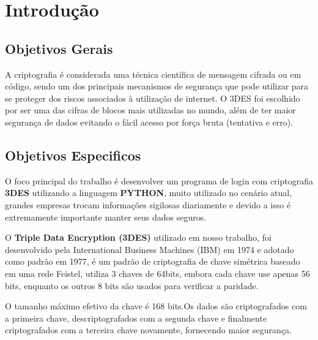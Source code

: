 




\textual\newpage
\chapter{\textbf{Introdução}}

\section{\textbf{Objetivos Gerais}}
\par A criptografia é considerada uma técnica científica de mensagem cifrada ou em código, sendo um dos principais mecanismos de segurança que pode utilizar para se proteger dos riscos associados à utilização de internet. O 3DES foi escolhido por ser uma das cifras de blocos mais utilizadas no mundo, além de ter maior segurança de dados evitando o fácil acesso por força bruta (tentativa e erro).

\section{\textbf{Objetivos Especificos}}
\par O foco principal do trabalho é desenvolver um programa de login com criptografia \textbf{3DES} utilizando a linguagem \textbf{PYTHON}, muito utilizado no cenário atual, grandes empresas trocam informações sigilosas diariamente e devido a isso é extremamente importante manter seus dados seguros. 

\par O \textbf{Triple Data Encryption (3DES)} utilizado em nosso trabalho, foi desenvolvido pela International Business Machines (IBM) em 1974 e adotado como padrão em 1977, é um padrão de criptografia de chave simétrica baseado em uma rede Feistel, utiliza 3 chaves de 64bits, embora cada chave use apenas 56 bits, enquanto os outros 8 bits são usados para verificar a paridade.

\par O tamanho máximo efetivo da chave é 168 bits.Os dados são criptografados com a primeira chave, descriptografados com a segunda chave e finalmente criptografados com a terceira chave novamente, fornecendo maior segurança. 

